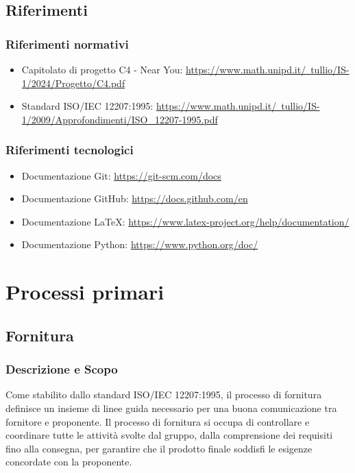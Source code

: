 \documentclass[10pt]{article}
\begin{document}
\begin{justify}
    \subsection{Riferimenti}
        \subsubsection{Riferimenti normativi}
        \begin{itemize}
            \item Capitolato di progetto C4 - Near You: \href{https://www.math.unipd.it/~tullio/IS-1/2024/Progetto/C4.pdf}{https://www.math.unipd.it/~tullio/IS-1/2024/Progetto/C4.pdf}
            \item Standard ISO/IEC 12207:1995: \href{https://www.math.unipd.it/~tullio/IS-1/2009/Approfondimenti/ISO_12207-1995.pdf}{https://www.math.unipd.it/~tullio/IS-1/2009/Approfondimenti/ISO\_12207-1995.pdf}
        \end{itemize}
        \subsubsection{Riferimenti tecnologici}
        \begin{itemize}
            \item Documentazione Git: \href{https://git-scm.com/docs}{https://git-scm.com/docs}
            \item Documentazione GitHub: \href{https://docs.github.com/en}{https://docs.github.com/en}
            \item Documentazione \LaTeX: \href{https://www.latex-project.org/help/documentation/}{https://www.latex-project.org/help/documentation/}
            \item Documentazione Python: \href{https://www.python.org/doc/}{https://www.python.org/doc/}
        \end{itemize}

\newpage
\section{Processi primari}
    \subsection{Fornitura}

    \subsubsection{Descrizione e Scopo}
    Come stabilito dallo standard ISO/IEC 12207:1995, il processo di fornitura definisce un insieme di linee guida necessario per una buona comunicazione tra fornitore e proponente. Il processo di fornitura si occupa di controllare e coordinare tutte le attività svolte dal gruppo, dalla comprensione dei requisiti fino alla consegna, per garantire che il prodotto finale soddisfi le esigenze concordate con la proponente.\\


\end{justify}
\end{document}
